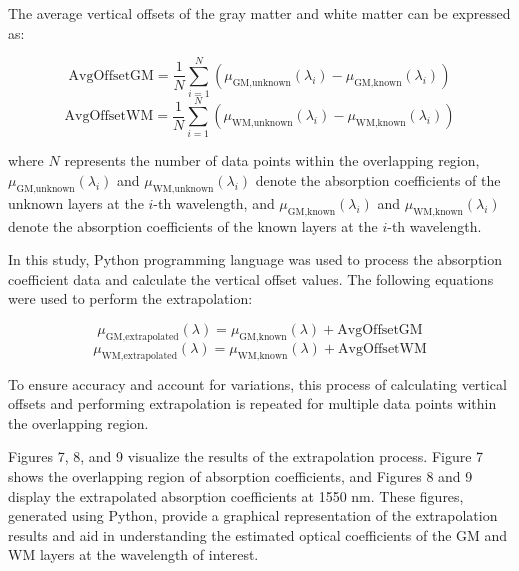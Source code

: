 \documentclass[journal,twoside,web]{ieeecolor}
\begin{document}
The average vertical offsets of the gray matter and white matter can be expressed as:

$$
\text{AvgOffsetGM} = \frac{1}{N} \sum_{i=1}^{N} (\mu_{\text{GM,unknown}}(\lambda_i) - \mu_{\text{GM,known}}(\lambda_i))
$$
$$
\text{AvgOffsetWM} = \frac{1}{N} \sum_{i=1}^{N} (\mu_{\text{WM,unknown}}(\lambda_i) - \mu_{\text{WM,known}}(\lambda_i))
$$

where \( N \) represents the number of data points within the overlapping region, \( \mu_{\text{GM,unknown}}(\lambda_i) \) and \( \mu_{\text{WM,unknown}}(\lambda_i) \) 
denote the absorption coefficients of the unknown layers at the \( i \)-th wavelength, and \( \mu_{\text{GM,known}}(\lambda_i) \) and 
\( \mu_{\text{WM,known}}(\lambda_i) \) denote the absorption coefficients of the known layers at the \( i \)-th wavelength.

In this study, Python programming language was used to process the absorption coefficient data and calculate the vertical offset values. 
The following equations were used to perform the extrapolation:

\[
\mu_{\text{GM,extrapolated}}(\lambda) = \mu_{\text{GM,known}}(\lambda) + \text{AvgOffsetGM}
\]
\[
\mu_{\text{WM,extrapolated}}(\lambda) = \mu_{\text{WM,known}}(\lambda) + \text{AvgOffsetWM}
\]

To ensure accuracy and account for variations, this process of calculating vertical offsets and performing extrapolation is repeated for 
multiple data points within the overlapping region.

Figures 7, 8, and 9 visualize the results of the extrapolation process. Figure 7 shows the overlapping region of absorption coefficients, and 
Figures 8 and 9 display the extrapolated absorption coefficients at 1550 nm. These figures, generated using Python, provide a graphical representation 
of the extrapolation results and aid in understanding the estimated optical coefficients of the GM and WM layers at the wavelength of interest.



\end{document}
